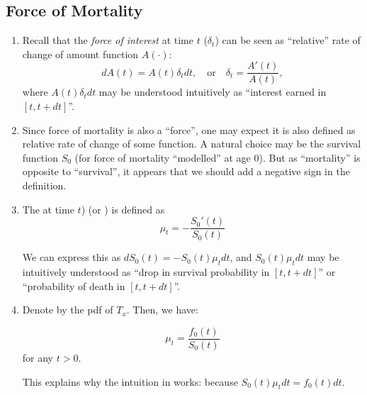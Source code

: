 \subsection{Force of Mortality}
\begin{enumerate}
\item Recall that the \emph{force of interest} at time \(t\) (\(\delta_t\)) can
be seen as ``relative'' rate of change of amount function \(A(\cdot)\):
\[
dA(t)=A(t)\delta_tdt,\quad\text{or}\quad
\delta_t=\frac{A'(t)}{A(t)},
\]
where \(A(t)\delta_tdt\) may be understood intuitively as ``interest earned in
\([t,t+dt]\)''.

\item Since force of mortality is also a ``force'', one may expect it is also
defined as relative rate of change of some function. A natural choice may be
the survival function \(S_0\) (for force of mortality ``modelled'' at age 0).
But as ``mortality'' is opposite to ``survival'', it appears that we should add
a negative sign in the definition.

\item \label{it:fom} The  at
time \(t\))  (or ) is defined as
\[
\mu_t=-\frac{S_0'(t)}{S_0(t)}
\]
\begin{intuition}
We can express this as \(dS_0(t)=-S_0(t)\mu_tdt\), and \(S_0(t)\mu_tdt\) may be
intuitively understood as ``drop in survival probability in \([t,t+dt]\)'' or
``probability of death in \([t,t+dt]\)''.

 \end{intuition}
\item Denote by  the pdf of \(T_x\). Then, we have:
\begin{proposition}
\label{prp:mu-pdf-0}
\[
\mu_t=\frac{f_0(t)}{S_0(t)}
\]
for any \(t>0\).
\end{proposition}

\begin{note}
This explains why the intuition in  works: because
\(S_0(t)\mu_tdt=f_0(t)dt\).
\end{note}


\end{enumerate}
